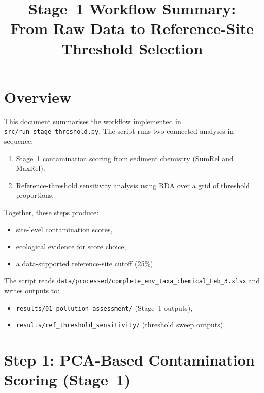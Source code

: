 \documentclass[11pt]{article}
\title{Stage~1 Workflow Summary:\\
  From Raw Data to Reference-Site Threshold Selection}
\author{}
\date{}
\begin{document}
\maketitle

\section{Overview}

This document summarises the workflow implemented in
\texttt{src/run\_stage\_threshold.py}. The script runs two connected
analyses in sequence:

\begin{enumerate}[leftmargin=*]
  \item Stage~1 contamination scoring from sediment chemistry
        (SumRel and MaxRel).
  \item Reference-threshold sensitivity analysis using RDA over a grid
        of threshold proportions.
\end{enumerate}

Together, these steps produce:
\begin{itemize}[leftmargin=*]
  \item site-level contamination scores,
  \item ecological evidence for score choice,
  \item a data-supported reference-site cutoff (25\%).
\end{itemize}

\noindent
The script reads
\texttt{data/processed/complete\_env\_taxa\_chemical\_Feb\_3.xlsx}
and writes outputs to:
\begin{itemize}[leftmargin=*]
  \item \texttt{results/01\_pollution\_assessment/} (Stage~1 outputs),
  \item \texttt{results/ref\_threshold\_sensitivity/} (threshold sweep outputs).
\end{itemize}

\section{Step 1: PCA-Based Contamination Scoring (Stage~1)}
\end{document}
